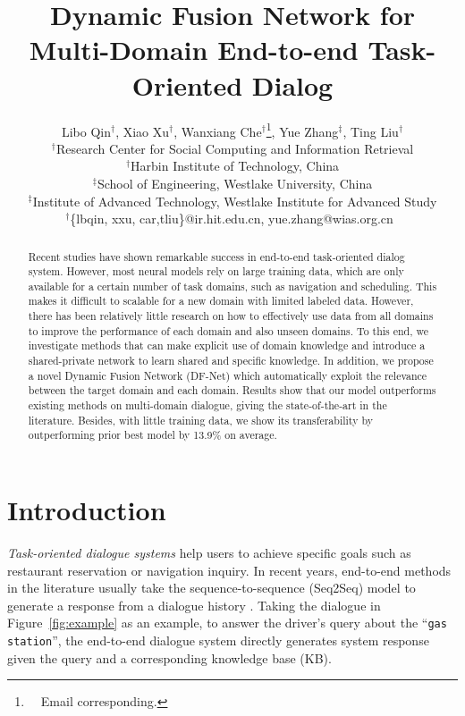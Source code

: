 \documentclass[11pt,a4paper]{article}
\title{
	Dynamic Fusion Network for Multi-Domain End-to-end Task-Oriented Dialog}
\author{Libo Qin$^{\dag}$, Xiao Xu$^{\dag}$, Wanxiang Che$^{\dag}$\thanks{\ \ Email corresponding.}, Yue Zhang$^{\ddag}$, Ting Liu$^{\dag}$ \\
	$^\dag$Research Center for Social Computing and Information Retrieval \\
	$^\dag$Harbin Institute of Technology, China \\
	$^\ddag$School of Engineering, Westlake University, China \\
		$^\ddag$Institute of Advanced Technology, Westlake Institute for Advanced Study \\
	 $^\dag$\{lbqin, xxu, car,tliu\}@ir.hit.edu.cn,
		yue.zhang@wias.org.cn\
}
\date{}
\begin{document}
\maketitle
\begin{abstract}
Recent studies have shown remarkable success in end-to-end task-oriented dialog system. 
However, most neural models rely on large training data, which are only available for a certain number of task domains, such as navigation and scheduling.
 This makes it difficult to scalable for a new domain with limited labeled data. 
However, there has been relatively little research on how to effectively use data from all domains to improve the performance of each domain and also unseen domains. 
To this end, we investigate methods that can make explicit use of domain knowledge and introduce a shared-private network to learn shared and specific knowledge. In addition, we propose a novel Dynamic Fusion Network (DF-Net) which automatically exploit the relevance between the target domain and each domain.
Results show that our model outperforms existing methods on multi-domain dialogue, giving the state-of-the-art in the literature. 
Besides, with little training data, we show its transferability by outperforming prior best model by 13.9\% on average.
\end{abstract}
\section{Introduction} \label{sec:intro}
\textit{Task-oriented dialogue systems} \cite{DBLP:journals/pieee/YoungGTW13} help users to achieve specific goals such as restaurant reservation or navigation inquiry.
In recent years, 
end-to-end methods
in the literature usually take the sequence-to-sequence (Seq2Seq) model to generate a response from a dialogue history \cite{eric-manning-2017-copy,eric-etal-2017-key,madotto-etal-2018-mem2seq,wen-etal-2018-sequence,gangi-reddy-etal-2019-multi,qin-etal-2019-entity,DBLP:conf/iclr/WuSX19}.
Taking the dialogue in Figure~\ref{fig:example} as an example, to answer the driver’s query about the ``\texttt{gas station}'', the end-to-end dialogue system directly generates system response given the query and a corresponding knowledge base (KB). 
\end{document}
